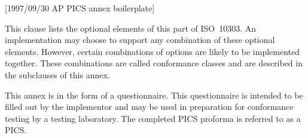 [1997/09/30 AP PICS annex boilerplate]

  This clause lists the optional elements of this part
of ISO~10303. An implementation may choose to support
any combination of these optional elements. However,
certain combinations of options are likely to be
implemented together. These combinations are called
conformance classes and are described in the subclauses
of this annex.

  This annex is in the form of a questionnaire. This
questionnaire is intended to be filled out by the
implementor and may be used in preparation for conformance
testing by a testing laboratory. The completed PICS proforma
is referred to as a PICS.

\endinput
